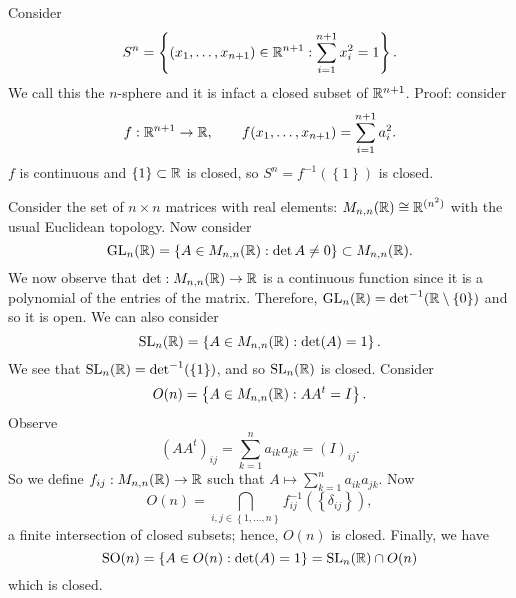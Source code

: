 

\begin{example}[]
	Consider
	\[
		S^n 
		= \left\{ (x_1, \ldots, x_{n+1}) \in \mathbb{R}^{n+1}:
			\sum_{i=1}^{n+1} x_i^2 = 1\right\}.
	\]
	We call this the $n$-sphere and it is infact a closed subset of $\mathbb{R}^{n+1}$.
	Proof: consider 
	\[
		f:\mathbb{R}^{n+1} \to \mathbb{R}, \qquad
		f(x_1, \ldots, x_{n+1}) = \sum_{i=1}^{n+1} a_i^2.
	\]
	$f$ is continuous and $\left\{ 1 \right\} \subset \mathbb{R}$ is closed, so
	$S^n = f^{-1}(\left\{ 1 \right\})$ is closed.
\end{example}

\begin{example}[]
	Consider the set of $n \times n$ matrices with real elements: 
	$M_{n,n}(\mathbb{R}) \cong \mathbb{R}^{(n^2)}$ with the usual Euclidean topology.
	Now consider
	\[
		\operatorname{GL}_n(\mathbb{R}) 
		= \left\{ A \in M_{n,n}(\mathbb{R}): \det A \neq 0 \right\}
		\subset M_{n,n}(\mathbb{R}).
	\]
	We now observe that $\det: M_{n,n}(\mathbb{R}) \to \mathbb{R}$ is a continuous function
	since it is a polynomial of the entries of the matrix.
	Therefore, 
	$\operatorname{GL}_n(\mathbb{R}) = \det^{-1}(\mathbb{R} \setminus \left\{ 0 \right\})$ 
	and so it is open.
	We can also consider
	\[
		\operatorname{SL}_n(\mathbb{R})
		= \left\{ A \in M_{n,n}(\mathbb{R}) : \det(A) = 1 \right\}.
	\]
	We see that $\operatorname{SL}_n(\mathbb{R}) = \det^{-1}(\left\{ 1 \right\})$, and 
	so $\operatorname{SL}_n(\mathbb{R})$ is closed.
	Consider
	\[
		O(n)
		= \left\{ A \in M_{n,n}(\mathbb{R}) : AA^t = I \right\}.
	\]
	Observe
	\[
		(AA^t)_{ij} = \sum_{k = 1}^n a_{ik}a_{jk} = (I)_{ij}.
	\]
	So we define $f_{ij}: M_{n,n}(\mathbb{R}) \to \mathbb{R}$ such that 
	$A \mapsto \sum_{k=1}^n a_{ik} a_{jk}$.
	Now
	\[
		O(n) 
		= \bigcap_{i,j \in \left\{ 1, \ldots, n \right\}}
			f^{-1}_{ij}\left( \left\{ \delta_{ij} \right\} \right),
	\]
	a finite intersection of closed subsets; hence, $O(n)$ is closed.
	Finally, we have
	\[
		\operatorname{SO}(n) 
		= \left\{ A \in O(n): \det(A) = 1 \right\} 
		= \operatorname{SL}_n(\mathbb{R}) \cap O(n)
	\]
	which is closed.
\end{example}
